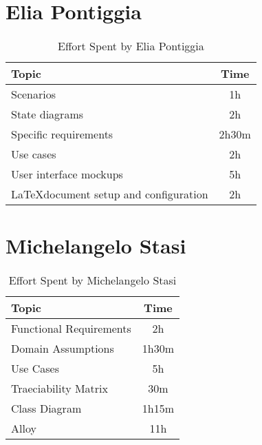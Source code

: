 \section*{Elia Pontiggia}
\begin{table}[H]
    \renewcommand{\arraystretch}{1.5}
    \centering
    \begin{tabular}{|l|c|}
        \hline
        \textbf{Topic}                                 & \textbf{Time} \\ \hline
        Scenarios                                      & 1h            \\ \hline
        State diagrams                                 & 2h            \\ \hline
        Specific requirements                          & 2h30m         \\ \hline
        Use cases                                      & 2h            \\ \hline
        User interface mockups                         & 5h            \\ \hline
        \LaTeX \space document setup and configuration & 2h            \\ \hline
    \end{tabular}
    \caption{Effort Spent by Elia Pontiggia}
    \label{tab:pontiggia-effort-spent}
\end{table}

\section*{Michelangelo Stasi}
\begin{table}[H]
    \renewcommand{\arraystretch}{1.5}
    \centering
    \begin{tabular}{|l|c|}
        \hline
        \textbf{Topic}          & \textbf{Time} \\ \hline
        Functional Requirements & 2h            \\ \hline
        Domain Assumptions      & 1h30m         \\ \hline
        Use Cases               & 5h            \\ \hline
        Traeciability Matrix    & 30m           \\ \hline
        Class Diagram           & 1h15m         \\ \hline
        Alloy                   & 11h            \\ \hline
    \end{tabular}
    \caption{Effort Spent by Michelangelo Stasi}
    \label{tab:stasi-effort-spent}
\end{table}
